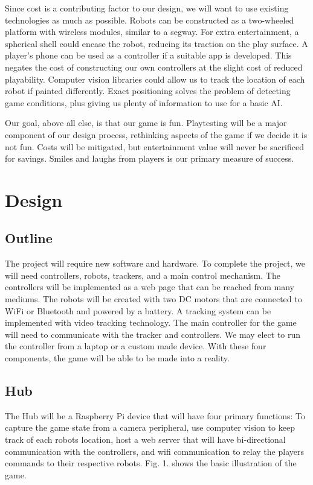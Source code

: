\documentclass[11pt]{ieeeconf}
\begin{document}
Since cost is a contributing factor to our design, we will want to use existing technologies as much as possible. Robots can be constructed as a two-wheeled platform with wireless modules, similar to a segway. For extra entertainment, a spherical shell could encase the robot, reducing its traction on the play surface. A player’s phone can be used as a controller if a suitable app is developed. This negates the cost of constructing our own controllers at the slight cost of reduced playability. Computer vision libraries could allow us to track the location of each robot if painted differently. Exact positioning solves the problem of detecting game conditions, plus giving us plenty of information to use for a basic AI. 

Our goal, above all else, is that our game is fun. Playtesting will be a major component of our design process, rethinking aspects of the game if we decide it is not fun. Costs will be mitigated, but entertainment value will never be sacrificed for savings. Smiles and laughs from players is our primary measure of success.

\section{Design}

\subsection{Outline}

The project will require new software and hardware. To complete the project, we will need controllers, robots, trackers, and a main control mechanism. The controllers will be implemented as a web page that can be reached from many mediums. The robots will be created with two DC motors that are connected to WiFi or Bluetooth and powered by a battery.  A tracking system can be implemented with video tracking technology. The main controller for the game will need to communicate with the tracker and controllers. We may elect to run the controller from a laptop or a custom made device. With these four components, the game will be able to be made into a reality. 

\subsection{Hub}

The Hub will be a Raspberry Pi device that will have four primary functions: To capture the game state from a camera peripheral, use computer vision to keep track of each robots location, host a web server that will have bi-directional communication with the controllers, and wifi communication to relay the players commands to their respective robots. Fig. 1. shows the basic illustration of the game.
\end{document}
